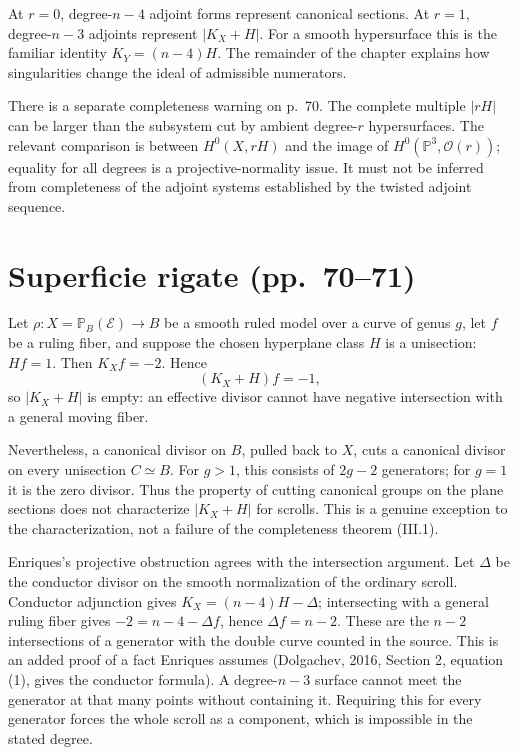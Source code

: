 At \(r=0\), degree-\(n-4\) adjoint forms represent canonical sections. At \(r=1\), degree-\(n-3\) adjoints represent \(|K_X+H|\). For a smooth hypersurface this is the familiar identity \(K_Y=(n-4)H\). The remainder of the chapter explains how singularities change the ideal of admissible numerators.

There is a separate completeness warning on p.~70. The complete multiple \(|rH|\) can be larger than the subsystem cut by ambient degree-\(r\) hypersurfaces. The relevant comparison is between \(H^0(X,rH)\) and the image of \(H^0(\mathbb{P}^3,\mathcal O(r))\); equality for all degrees is a projective-normality issue. It must not be inferred from completeness of the adjoint systems established by the twisted adjoint sequence.

\section[Superficie rigate]{Superficie rigate (pp.~70--71)}\label{commentary-III-3}

Let \(\rho:X=\mathbb{P}_B(\mathcal E)\to B\) be a smooth ruled model over a curve of genus \(g\), let \(f\) be a ruling fiber, and suppose the chosen hyperplane class \(H\) is a unisection: \(Hf=1\). Then \(K_Xf=-2\). Hence \[
(K_X+H)f=-1,
\] so \(|K_X+H|\) is empty: an effective divisor cannot have negative intersection with a general moving fiber.

Nevertheless, a canonical divisor on \(B\), pulled back to \(X\), cuts a canonical divisor on every unisection \(C\simeq B\). For \(g>1\), this consists of \(2g-2\) generators; for \(g=1\) it is the zero divisor. Thus the property of cutting canonical groups on the plane sections does not characterize \(|K_X+H|\) for scrolls. This is a genuine exception to the characterization, not a failure of the completeness theorem (III.1).

Enriques's projective obstruction agrees with the intersection argument. Let \(\Delta\) be the conductor divisor on the smooth normalization of the ordinary scroll. Conductor adjunction gives \(K_X=(n-4)H-\Delta\); intersecting with a general ruling fiber gives \(-2=n-4-\Delta f\), hence \(\Delta f=n-2\). These are the \(n-2\) intersections of a generator with the double curve counted in the source. This is an added proof of a fact Enriques assumes (Dolgachev, 2016, Section 2, equation (1), gives the conductor formula). A degree-\(n-3\) surface cannot meet the generator at that many points without containing it. Requiring this for every generator forces the whole scroll as a component, which is impossible in the stated degree.

